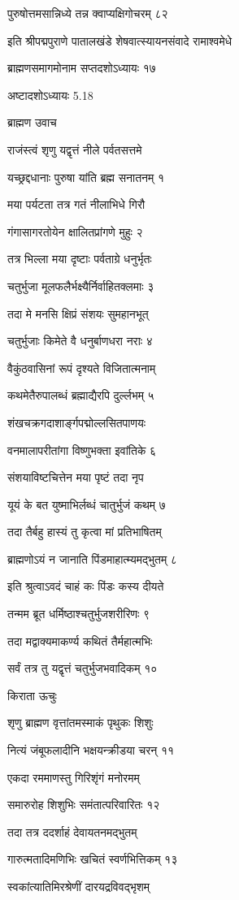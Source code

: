 पुरुषोत्तमसान्निध्ये तन्न क्वाप्यक्षिगोचरम् ८२

इति श्रीपद्मपुराणे पातालखंडे शेषवात्स्यायनसंवादे रामाश्वमेधे

ब्राह्मणसमागमोनाम सप्तदशोऽध्यायः १७

अष्टादशोऽध्यायः 5.18

ब्राह्मण उवाच

राजंस्त्वं शृणु यद्वृत्तं नीले पर्वतसत्तमे

यच्छ्रद्दधानाः पुरुषा यांति ब्रह्म सनातनम् १

मया पर्यटता तत्र गतं नीलाभिधे गिरौ

गंगासागरतोयेन क्षालितप्रांगणे मुहुः २

तत्र भिल्ला मया दृष्टाः पर्वताग्रे धनुर्भृतः

चतुर्भुजा मूलफलैर्भक्ष्यैर्निर्वाहितक्लमाः ३

तदा मे मनसि क्षिप्रं संशयः सुमहानभूत्

चतुर्भुजाः किमेते वै धनुर्बाणधरा नराः ४

वैकुंठवासिनां रूपं दृश्यते विजितात्मनाम्

कथमेतैरुपालब्धं ब्रह्माद्यैरपि दुर्ल्लभम् ५

शंखचक्रगदाशार्ङ्गपद्मोल्लसितपाणयः

वनमालापरीतांगा विष्णुभक्ता इवांतिके ६

संशयाविष्टचित्तेन मया पृष्टं तदा नृप

यूयं के बत युष्माभिर्लब्धं चातुर्भुजं कथम् ७

तदा तैर्बहु हास्यं तु कृत्वा मां प्रतिभाषितम्

ब्राह्मणोऽयं न जानाति पिंडमाहात्म्यमद्भुतम् ८

इति श्रुत्वाऽवदं चाहं कः पिंडः कस्य दीयते

तन्मम ब्रूत धर्मिष्ठाश्चतुर्भुजशरीरिणः ९

तदा मद्वाक्यमाकर्ण्य कथितं तैर्महात्मभिः

सर्वं तत्र तु यद्वृत्तं चतुर्भुजभवादिकम् १०

किराता ऊचुः

शृणु ब्राह्मण वृत्तांतमस्माकं पृथुकः शिशुः

नित्यं जंबूफलादीनि भक्षयन्क्रीडया चरन् ११

एकदा रममाणस्तु गिरिशृंगं मनोरमम्

समारुरोह शिशुभिः समंतात्परिवारितः १२

तदा तत्र ददर्शाहं देवायतनमद्भुतम्

गारुत्मतादिमणिभिः खचितं स्वर्णभित्तिकम् १३

स्वकांत्यातिमिरश्रेणीं दारयद्रविवद्भृशम्


